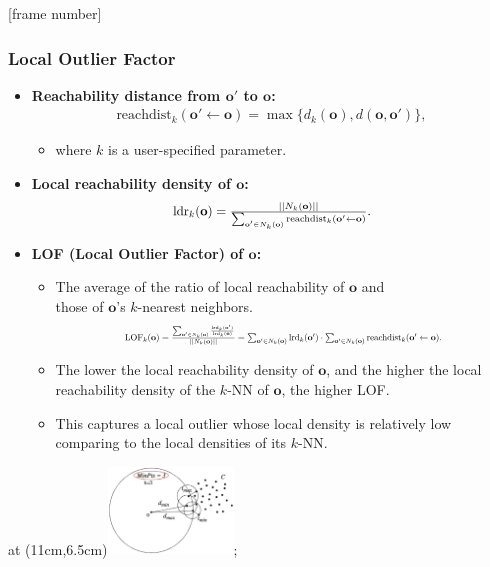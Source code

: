 \documentclass[aspectratio=169,t,xcolor=dvipsnames]{beamer}
\begin{document}
{
  [frame number]
  \begin{frame}
  	\frametitle{Local Outlier Factor}
  	\begin{itemize}
  		\item \textbf{\color{airforceblue}Reachability distance from $\mathbf{o'}$ to $\mathbf{o}$:}
      \begin{align*}
  		   \text{reachdist}_k(\mathbf{o'} \leftarrow \mathbf{o}) = \max \{d_k(\mathbf{o}), d(\mathbf{o},\mathbf{o'})\},
      \end{align*}
  		      \begin{itemize}
  		      	\item where $k$ is a user-specified parameter.
  		      \end{itemize}
  		\item \textbf{Local reachability density of $\mathbf{o}$:}
      \begin{align*}
        \resizebox{5cm}{!}{%
    		$\text{ldr}_k(\mathbf{o}) = \frac{||N_k(\mathbf{o})||}{\sum_{\mathbf{o'} \in N_k(\mathbf{o})} \text{reachdist}_k(\mathbf{o'} \leftarrow \mathbf{o})}.$}
      \end{align*}
  		\item \textbf{LOF (Local Outlier Factor) of $\mathbf{o}$:}
  		\begin{itemize}
  		    \item The average of the ratio of local reachability of $\mathbf{o}$ and \\
          those of $\mathbf{o}$'s $k$-nearest neighbors.
        \begin{align*}
          \resizebox{8cm}{!}{%
      		$\text{LOF}_k(\mathbf{o}) = \frac{\sum_{\mathbf{o'} \in N_k(\mathbf{o})} \frac{\text{lrd}_k(\mathbf{o'})}{\text{lrd}_k(\mathbf{o})}}{||N_k(\mathbf{o})||} =
    		  \sum_{\mathbf{o'} \in N_k(\mathbf{o})} \text{lrd}_k(\mathbf{o'}) \cdot \sum_{\mathbf{o'} \in N_k(\mathbf{o})} \text{reachdist}_k(\mathbf{o'} \leftarrow \mathbf{o}).$}
        \end{align*}
        \item The lower the local reachability density of $\mathbf{o}$, and the higher the local reachability density of the $k$-NN of $\mathbf{o}$, the higher LOF.
    		\item This captures a local outlier whose local density is relatively low comparing to the local densities of its $k$-NN.
      \end{itemize}
  	\end{itemize}
  	\tikzoverlay at (11cm,6.5cm){\includegraphics[width=0.25\textwidth]{img/density.png}};
  \end{frame}
}
\end{document}
